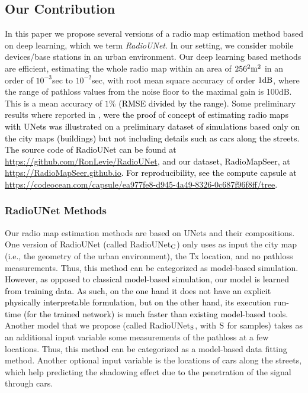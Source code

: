 \documentclass[10pt,a4paper]{article}
\begin{document}
\subsection{Our Contribution}
\label{subsec:contr}

In this paper we propose several versions of a radio map estimation method based on deep learning, which we term \emph{RadioUNet}. %
 In our setting, we consider mobile devices/base stations in an urban environment. Our deep learning based methods are efficient, estimating the whole radio map within an area of $256^2 {\rm m}^2$ in an order of $10^{-3}$sec to $10^{-2}$sec, with root mean square accuracy of order $1{\rm dB}$, where the range of pathloss values from the noise floor to the maximal gain is 100dB. This is a mean accuracy of $1\%$ \textcolor{black}{(RMSE divided by the range)}.
Some preliminary results where reported in \cite{RadioUNetConf}, \textcolor{black}{were the proof of concept of estimating radio maps with UNets was illustrated on a preliminary dataset of simulations based only on the city maps (buildings) but not including details such as cars along the streets.}
\textcolor{black}{The source code of RadioUNet can be found at \url{https://github.com/RonLevie/RadioUNet}, and our dataset, RadioMapSeer, at \url{ https://RadioMapSeer.github.io}. For reproducibility, see the compute capsule at \url{https://codeocean.com/capsule/ea977fe8-d945-4a49-8326-0c687f96f8ff/tree}.}

\subsubsection{RadioUNet Methods}

Our radio map estimation methods are based on UNets \cite{UNet} and their compositions.
One version of RadioUNet (called RadioUNet$_{\rm C}$) only uses as input the city map (i.e., the geometry of the urban environment), 
the Tx location, and no pathloss measurements. %
Thus, this method can be categorized as model-based simulation. \textcolor{black}{However, as opposed to classical model-based simulation, our model is learned from training data. As such, on the one hand it does not have an explicit physically interpretable formulation, but on the other hand, its execution run-time (for the trained network) is much faster than existing model-based tools.} 
Another model that we propose (called RadioUNet$_{\rm S}$, with $\rm S$ for samples) takes  %
as an additional input variable some measurements of the pathloss at a few locations. 
Thus, this method can be categorized as a model-based data fitting method. %
Another optional input variable is the locations of cars along the streets, which help predicting the shadowing effect due to the penetration of the signal through cars.
\end{document}
